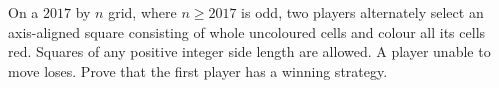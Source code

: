 On a $2017$ by $n$ grid, where $n\ge2017$ is odd, two players alternately select an axis-aligned square consisting of whole uncoloured cells and colour all its cells red. Squares of any positive integer side length are allowed. A player unable to move loses. Prove that the first player has a winning strategy.

